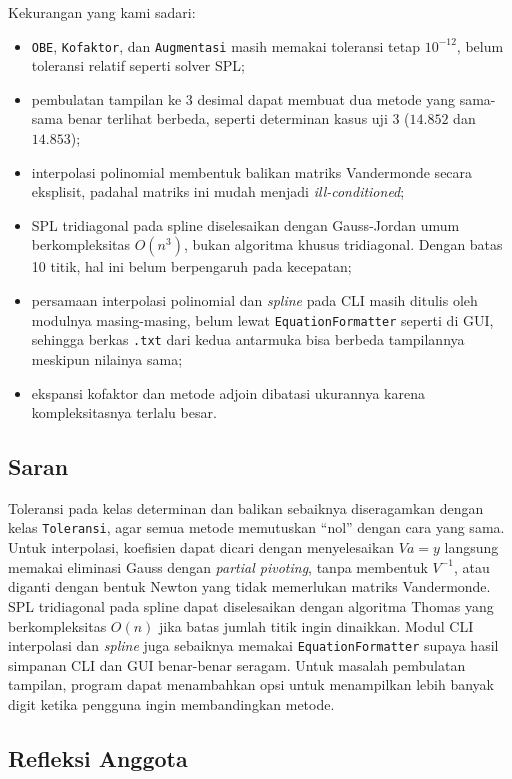 Kekurangan yang kami sadari:
\begin{itemize}[nosep]
  \item \texttt{OBE}, \texttt{Kofaktor}, dan \texttt{Augmentasi} masih memakai toleransi tetap $10^{-12}$, belum toleransi relatif seperti solver SPL;
  \item pembulatan tampilan ke 3 desimal dapat membuat dua metode yang sama-sama benar terlihat berbeda, seperti determinan kasus uji 3 ($14.852$ dan $14.853$);
  \item interpolasi polinomial membentuk balikan matriks Vandermonde secara eksplisit, padahal matriks ini mudah menjadi \textit{ill-conditioned};
  \item SPL tridiagonal pada spline diselesaikan dengan Gauss-Jordan umum berkompleksitas $O(n^3)$, bukan algoritma khusus tridiagonal. Dengan batas 10 titik, hal ini belum berpengaruh pada kecepatan;
  \item persamaan interpolasi polinomial dan \textit{spline} pada CLI masih ditulis oleh modulnya masing-masing, belum lewat \texttt{EquationFormatter} seperti di GUI, sehingga berkas \texttt{.txt} dari kedua antarmuka bisa berbeda tampilannya meskipun nilainya sama;
  \item ekspansi kofaktor dan metode adjoin dibatasi ukurannya karena kompleksitasnya terlalu besar.
\end{itemize}

\subsection{Saran}

Toleransi pada kelas determinan dan balikan sebaiknya diseragamkan dengan kelas \texttt{Toleransi}, agar semua metode memutuskan ``nol'' dengan cara yang sama. Untuk interpolasi, koefisien dapat dicari dengan menyelesaikan $Va = y$ langsung memakai eliminasi Gauss dengan \textit{partial pivoting}, tanpa membentuk $V^{-1}$, atau diganti dengan bentuk Newton yang tidak memerlukan matriks Vandermonde. SPL tridiagonal pada spline dapat diselesaikan dengan algoritma Thomas yang berkompleksitas $O(n)$ jika batas jumlah titik ingin dinaikkan. Modul CLI interpolasi dan \textit{spline} juga sebaiknya memakai \texttt{EquationFormatter} supaya hasil simpanan CLI dan GUI benar-benar seragam. Untuk masalah pembulatan tampilan, program dapat menambahkan opsi untuk menampilkan lebih banyak digit ketika pengguna ingin membandingkan metode.

\subsection{Refleksi Anggota}


